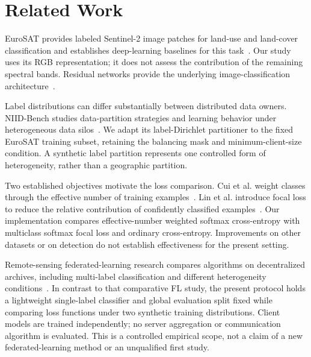 \section{Related Work}
EuroSAT provides labeled Sentinel-2 image patches for land-use and land-cover classification and establishes deep-learning baselines for this task~\cite{helber2019}. Our study uses its RGB representation; it does not assess the contribution of the remaining spectral bands. Residual networks provide the underlying image-classification architecture~\cite{he2016}.

Label distributions can differ substantially between distributed data owners. NIID-Bench studies data-partition strategies and learning behavior under heterogeneous data silos~\cite{li2022}. We adapt its label-Dirichlet partitioner to the fixed EuroSAT training subset, retaining the balancing mask and minimum-client-size condition. A synthetic label partition represents one controlled form of heterogeneity, rather than a geographic partition.

Two established objectives motivate the loss comparison. Cui et al. weight classes through the effective number of training examples~\cite{cui2019}. Lin et al. introduce focal loss to reduce the relative contribution of confidently classified examples~\cite{lin2017}. Our implementation compares effective-number weighted softmax cross-entropy with multiclass softmax focal loss and ordinary cross-entropy. Improvements on other datasets or on detection do not establish effectiveness for the present setting.

Remote-sensing federated-learning research compares algorithms on decentralized archives, including multi-label classification and different heterogeneity conditions~\cite{buyuktas2023}. In contrast to that comparative FL study, the present protocol holds a lightweight single-label classifier and global evaluation split fixed while comparing loss functions under two synthetic training distributions. Client models are trained independently; no server aggregation or communication algorithm is evaluated. This is a controlled empirical scope, not a claim of a new federated-learning method or an unqualified first study.
